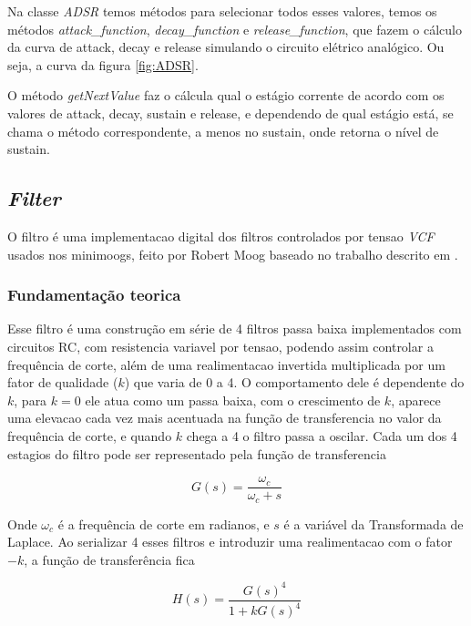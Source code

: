 \documentclass{article}
\begin{document}
Na classe \emph{ADSR} temos métodos para selecionar todos esses valores, temos os métodos \emph{attack\_function}, \emph{decay\_function}
 e \emph{release\_function}, que fazem o cálculo da curva de attack, decay e release simulando o circuito elétrico analógico. Ou seja, a curva da figura \ref{fig:ADSR}.



O método \emph{getNextValue} faz o cálcula qual o estágio corrente de acordo com os valores de attack, decay, sustain e release, e dependendo de 
qual estágio está, se chama o método correspondente, a menos no sustain, onde retorna o nível de sustain.



\subsection{\emph{Filter}}


O filtro é uma implementacao digital dos filtros controlados por tensao \emph{VCF} usados nos minimoogs, feito por Robert Moog baseado no 
trabalho descrito em \cite{moog_filter}. 
\subsubsection{Fundamentação teorica}
Esse filtro
 é uma construção em série de 4 filtros passa baixa implementados com circuitos RC, com resistencia variavel por tensao, podendo assim controlar a
 frequência de corte, além de uma realimentacao invertida multiplicada por um fator de qualidade ($k$) que varia de 0 a 4.
O comportamento dele é dependente do $k$, para $k=0$ ele atua como um passa baixa, com o crescimento de $k$, aparece uma elevacao 
cada vez mais acentuada na função de transferencia no valor da frequência de corte, e quando $k$ chega a 4 o filtro passa a oscilar.
Cada um dos 4 estagios do filtro pode ser representado pela função de transferencia

\begin{equation}\label{eq:(1)}
G(s) = \frac{\omega_c}{\omega_c+s}  
\end{equation}

Onde $\omega_c$ é a frequência de corte em radianos, e $s$ é a variável da Transformada de Laplace.
Ao serializar 4 esses filtros e introduzir uma realimentacao com o fator $-k$, a função de transferência fica

\begin{equation}\label{eq:(2)}
 H(s) = \frac{G(s)^4}{1+k G(s)^4} 
\end{equation}
\end{document}
